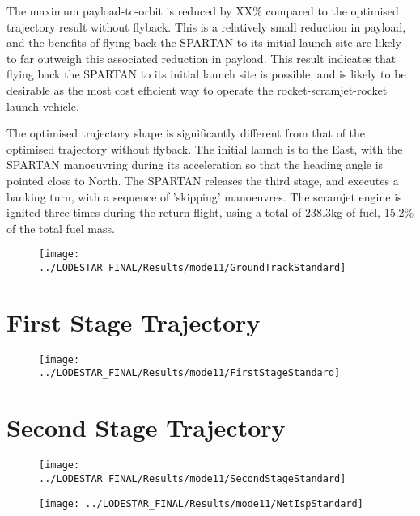 The maximum payload-to-orbit is reduced by XX\% compared to the optimised trajectory result without flyback. This is a relatively small reduction in payload, and the benefits of flying back the SPARTAN to its initial launch site are likely to far outweigh this associated reduction in payload. This result indicates that flying back the SPARTAN to its initial launch site is possible, and is likely to be desirable as the most cost efficient way to operate the rocket-scramjet-rocket launch vehicle. 

The optimised trajectory shape is significantly different from that of the optimised trajectory without flyback. The initial launch is to the East, with the SPARTAN manoeuvring during its acceleration so that the heading angle is pointed close to North. The SPARTAN releases the third stage, and executes a banking turn, with a sequence of 'skipping' manoeuvres. The scramjet engine is ignited three times during the return flight, using a total of 238.3kg of fuel, 15.2\% of the total fuel mass.

\begin{figure}[ht]
	\centering
	\texttt{[image: ../LODESTAR\_FINAL/Results/mode11/GroundTrackStandard]}
	\caption{}
	\label{fig:GroundTrackStandard}
\end{figure}

\section{First Stage Trajectory}
\begin{figure}[ht]
\centering
\texttt{[image: ../LODESTAR\_FINAL/Results/mode11/FirstStageStandard]}
\caption{}
\label{fig:FirstStageStandard}
\end{figure}

\section{Second Stage Trajectory}
\begin{figure}[ht]
\centering
\texttt{[image: ../LODESTAR\_FINAL/Results/mode11/SecondStageStandard]}
\caption{}
\label{fig:SecondStageStandard}
\end{figure}

\begin{figure}[ht]
\centering
\texttt{[image: ../LODESTAR\_FINAL/Results/mode11/NetIspStandard]}
\caption{}
\label{fig:NetIspStandard}
\end{figure}



